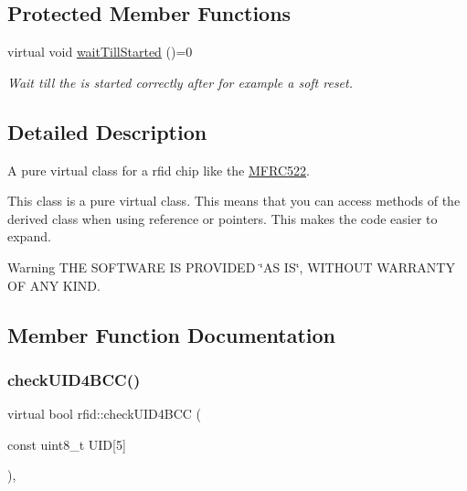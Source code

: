\subsection*{Protected Member Functions}
\begin{DoxyCompactItemize}
\item 
\mbox{\label{classrfid_aa8c64df0877a6bad52b08cfdcaea02bc}} 
virtual void \mbox{\hyperlink{classrfid_aa8c64df0877a6bad52b08cfdcaea02bc}{wait\+Till\+Started}} ()=0
\begin{DoxyCompactList}\small\item\em Wait till the is started correctly after for example a soft reset. \end{DoxyCompactList}\end{DoxyCompactItemize}


\subsection{Detailed Description}
A pure virtual class for a rfid chip like the \mbox{\hyperlink{class_m_f_r_c522}{M\+F\+R\+C522}}. 

This class is a pure virtual class. This means that you can access methods of the derived class when using reference or pointers. This makes the code easier to expand. \begin{DoxyWarning}{Warning}
T\+HE S\+O\+F\+T\+W\+A\+RE IS P\+R\+O\+V\+I\+D\+ED \char`\"{}\+A\+S I\+S\char`\"{}, W\+I\+T\+H\+O\+UT W\+A\+R\+R\+A\+N\+TY OF A\+NY K\+I\+ND. 
\end{DoxyWarning}


\subsection{Member Function Documentation}
\mbox{\label{classrfid_a4ca2918b2b7011a6eb685ea547c21826}} 
\subsubsection{\texorpdfstring{check\+U\+I\+D4\+B\+C\+C()}{checkUID4BCC()}}
{\footnotesize\ttfamily virtual bool rfid\+::check\+U\+I\+D4\+B\+CC (\begin{DoxyParamCaption}\item[{const uint8\+\_\+t}]{U\+ID\mbox{[}5\mbox{]} }\end{DoxyParamCaption})\hspace{0.3cm}{\ttfamily [inline]}, {\ttfamily [virtual]}}



